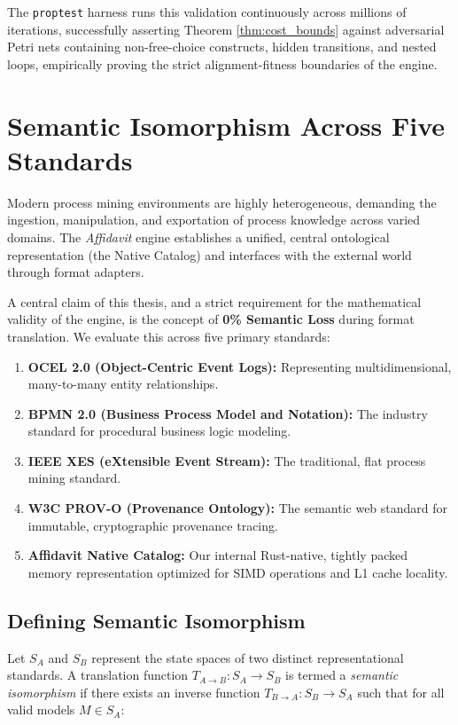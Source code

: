 The \texttt{proptest} harness runs this validation continuously across millions of iterations, successfully asserting Theorem \ref{thm:cost_bounds} against adversarial Petri nets containing non-free-choice constructs, hidden transitions, and nested loops, empirically proving the strict alignment-fitness boundaries of the engine.

\section{Semantic Isomorphism Across Five Standards}

Modern process mining environments are highly heterogeneous, demanding the ingestion, manipulation, and exportation of process knowledge across varied domains. The \textit{Affidavit} engine establishes a unified, central ontological representation (the Native Catalog) and interfaces with the external world through format adapters. 

A central claim of this thesis, and a strict requirement for the mathematical validity of the engine, is the concept of \textbf{0\% Semantic Loss} during format translation. We evaluate this across five primary standards:
\begin{enumerate}
    \item \textbf{OCEL 2.0 (Object-Centric Event Logs):} Representing multidimensional, many-to-many entity relationships.
    \item \textbf{BPMN 2.0 (Business Process Model and Notation):} The industry standard for procedural business logic modeling.
    \item \textbf{IEEE XES (eXtensible Event Stream):} The traditional, flat process mining standard.
    \item \textbf{W3C PROV-O (Provenance Ontology):} The semantic web standard for immutable, cryptographic provenance tracing.
    \item \textbf{Affidavit Native Catalog:} Our internal Rust-native, tightly packed memory representation optimized for SIMD operations and L1 cache locality.
\end{enumerate}

\subsection{Defining Semantic Isomorphism}

Let $S_A$ and $S_B$ represent the state spaces of two distinct representational standards. A translation function $T_{A \to B}: S_A \rightarrow S_B$ is termed a \textit{semantic isomorphism} if there exists an inverse function $T_{B \to A}: S_B \rightarrow S_A$ such that for all valid models $M \in S_A$:

